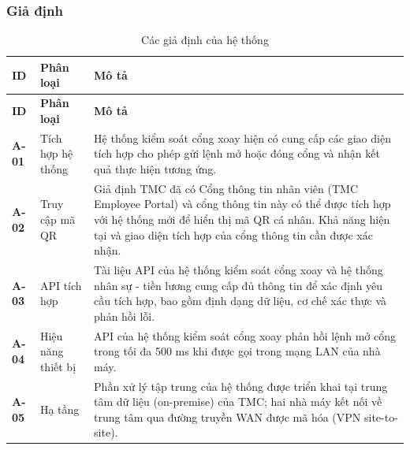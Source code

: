 \subsubsection{Giả định}
\begingroup
\small
\renewcommand{\arraystretch}{1.2}
\begin{longtable}{|>{\centering\arraybackslash}m{1.3cm}|>{\raggedright\arraybackslash}m{3cm}|>{\raggedright\arraybackslash}m{11.5cm}|}
    \caption{Các giả định của hệ thống}\label{tab:system-assumptions}\\
    \hline
    \textbf{ID} & \textbf{Phân loại} & \textbf{Mô tả}\\
    \hline
    \endfirsthead
    \hline
    \textbf{ID} & \textbf{Phân loại} & \textbf{Mô tả}\\
    \hline
    \endhead
    \hline
    \endfoot
    \hline
    \endlastfoot
    \textbf{A-01} & Tích hợp hệ thống & Hệ thống kiểm soát cổng xoay hiện có cung cấp các giao diện tích hợp cho phép gửi lệnh mở hoặc đóng cổng và nhận kết quả thực hiện tương ứng.\\
    \hline
    \textbf{A-02} & Truy cập mã QR & Giả định TMC đã có Cổng thông tin nhân viên (TMC Employee Portal) và cổng thông tin này có thể được tích hợp với hệ thống mới để hiển thị mã QR cá nhân. Khả năng hiện tại và giao diện tích hợp của cổng thông tin cần được xác nhận.\\
    \hline
    \textbf{A-03} & API tích hợp & Tài liệu API của hệ thống kiểm soát cổng xoay và hệ thống nhân sự - tiền lương cung cấp đủ thông tin để xác định yêu cầu tích hợp, bao gồm định dạng dữ liệu, cơ chế xác thực và phản hồi lỗi.\\
    \hline
    \textbf{A-04} & Hiệu năng thiết bị & API của hệ thống kiểm soát cổng xoay phản hồi lệnh mở cổng trong tối đa 500 ms khi được gọi trong mạng LAN của nhà máy.\\
    \hline
    \textbf{A-05} & Hạ tầng & Phần xử lý tập trung của hệ thống được triển khai tại trung tâm dữ liệu (on-premise) của TMC; hai nhà máy kết nối về trung tâm qua đường truyền WAN được mã hóa (VPN site-to-site).\\
    \hline
\end{longtable}
\endgroup

